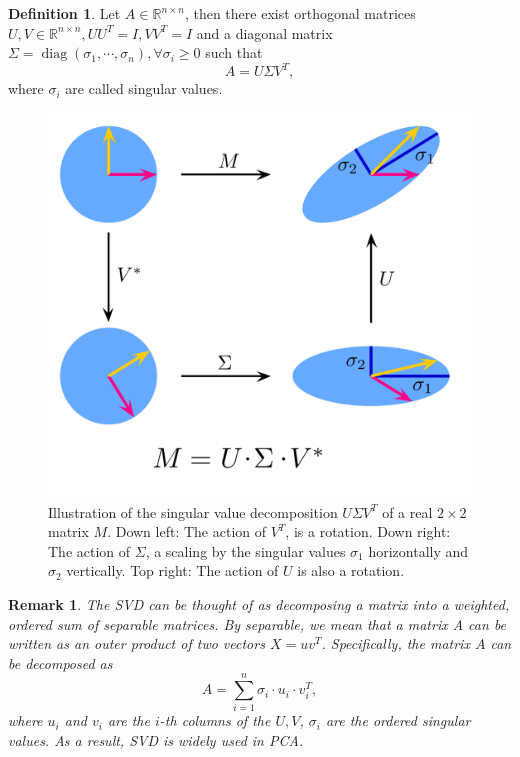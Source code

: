 \documentclass[a4paper]{article}
\theoremstyle{definition}
\newtheorem{definition}{Definition}
\theoremstyle{plain}
\newtheorem{remark}{Remark}
\begin{document}
\begin{definition}
 Let $A\in\mathbb{R}^{n\times n}$, then there exist orthogonal matrices $U,V\in\mathbb{R}^{n\times n}, UU^T=I, VV^T=I$ and a diagonal matrix $\Sigma=\operatorname{diag}(\sigma_1,\cdots,\sigma_n), \forall \sigma_i\ge0$ such that 
\begin{equation*}
    A=U\Sigma V^T,
\end{equation*}
where $\sigma_i$ are called singular values.
\end{definition}

\begin{figure}[H]
    \centering
    \includegraphics[scale=0.1]{figure/svd.png}
    \caption{Illustration of the singular value decomposition $U\Sigma V^T$ of a real $2\times2$ matrix $M$.
    Down left: The action of $V^T$, is a rotation.
    Down right: The action of $\Sigma$, a scaling by the singular values $\sigma_1$ horizontally and $\sigma_2$ vertically.
    Top right: The action of $U$ is also a rotation.}
    \label{fig:my_label}
\end{figure}

\begin{remark}
The SVD can be thought of as decomposing a matrix into a weighted, ordered sum of separable matrices. By separable, we mean that a matrix A can be written as an outer product of two vectors $X = uv^T$. Specifically, the matrix $A$ can be decomposed as
\begin{equation*}
    A=\sum_{i=1}^n\sigma_i\cdot u_i\cdot v^T_i,
\end{equation*}
where $u_i$ and $v_i$ are the $i$-th columns of the $U,V$, $\sigma_i$ are the ordered singular values. As a result, SVD is widely used in PCA.
\end{remark}
\end{document}
